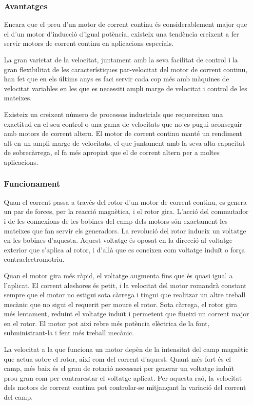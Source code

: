 \subsubsection{Avantatges}
Encara que el preu d'un motor de corrent continu és considerablement major que el d'un motor d'inducció d'igual potència, existeix una tendència creixent a fer servir motors de corrent continu en aplicacions especials.

La gran varietat de la velocitat, juntament amb la seva facilitat de control i la gran flexibilitat de les característiques par-velocitat del motor de corrent continu, han fet que en els últims anys es faci servir cada cop més amb màquines de velocitat variables en les que es necessiti ampli marge de velocitat i control de les mateixes.

Existeix un creixent número de processos industrials que requereixen una exactitud en el seu control o una gama de velocitats que no es pugui aconseguir amb motors de corrent altern. El motor de corrent continu manté un rendiment alt en un ampli marge de velocitats, el que juntament amb la seva alta capacitat de sobrecàrrega, el fa més apropiat que el de corrent altern per a moltes aplicacions.

\subsubsection{Funcionament}
Quan el corrent passa a través del rotor d'un motor de corrent continu, es genera un par de forces, per la reacció magnètica, i el rotor gira. L'acció del commutador i de les connexions de les bobines del camp dels motors són exactament les mateixes que fan servir els generadors. La revolució del rotor indueix un voltatge en les bobines d'aquesta. Aquest voltatge és oposat en la direcció al voltatge exterior que s'aplica al rotor, i d'allà que es coneixen com voltatge induït o força contraelectromotriu. 

Quan el motor gira més ràpid, el voltatge augmenta fins que és quasi igual a l'aplicat. El corrent aleshores és petit, i la velocitat del motor romandrà constant sempre que el motor no estigui sota càrrega i tingui que realitzar un altre treball mecànic que no sigui el requerit per moure el rotor. Sota càrrega, el rotor gira més lentament, reduint el voltatge induït i permetent que flueixi un corrent major en el rotor. El motor pot així rebre més potència elèctrica de la font, subministrant-la i fent més treball mecànic.

La velocitat a la que funciona un motor depèn de la intensitat del camp magnètic que actua sobre el rotor, així com del corrent d'aquest. Quant més fort és el camp, més baix és el grau de rotació necessari per generar un voltatge induït prou gran com per contrarestar el voltatge aplicat. Per aquesta raó, la velocitat dels motors de corrent continu pot controlar-se mitjançant la variació del corrent del camp.

